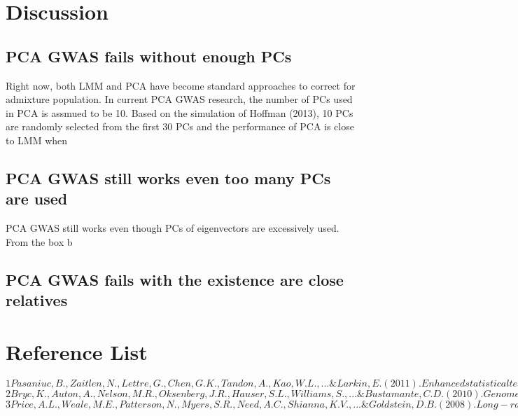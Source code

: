 \documentclass[12pt]{article}
\begin{document}
\section{Discussion}
\subsection{PCA GWAS fails without enough PCs}
Right now, both LMM and PCA have become standard approaches to correct for admixture population. In current PCA GWAS research, the number of PCs used in PCA is assmued to be 10. Based on the simulation of Hoffman (2013), 10 PCs are randomly selected from the first 30 PCs and the performance of PCA is close to LMM when 
\subsection{PCA GWAS still works even too many PCs are used}
PCA GWAS still works even though PCs of eigenvectors are excessively used. From the box b



\subsection{PCA GWAS fails with the existence are close relatives }



\section{Reference List}
$
1
Pasaniuc, B., Zaitlen, N., Lettre, G., Chen, G. K., Tandon, A., Kao, W. L., ... \& Larkin, E. (2011). Enhanced statistical tests for GWAS in admixed populations: assessment using African Americans from CARe and a Breast Cancer Consortium. PLoS genetics, 7(4), e1001371.
$\\

$
2
Bryc, K., Auton, A., Nelson, M. R., Oksenberg, J. R., Hauser, S. L., Williams, S., ... \& Bustamante, C. D. (2010). Genome-wide patterns of population structure and admixture in West Africans and African Americans. Proceedings of the National Academy of Sciences, 107(2), 786-791.
$\\

$
3
Price, A. L., Weale, M. E., Patterson, N., Myers, S. R., Need, A. C., Shianna, K. V., ... \& Goldstein, D. B. (2008). Long-range LD can confound genome scans in admixed populations. The American Journal of Human Genetics, 83(1), 132-135.
$\\
\end{document}
